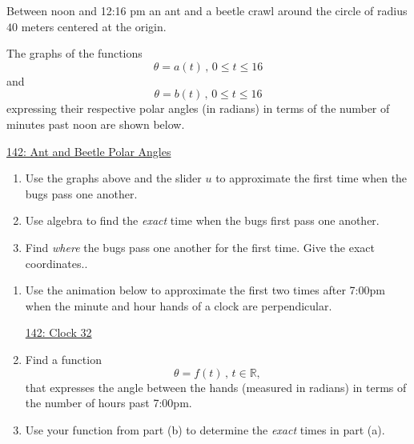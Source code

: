 \documentclass{ximera}
\begin{document}
\begin{question}  \label{Q9dfdfhhhfe94tf4}

Between noon and 12:16 pm an ant and a beetle crawl around the circle of radius $40$ meters centered at the origin.  

The graphs of the functions
\[
  \theta = a(t) \, , \, 0\leq t \leq 16
\]
and
\[
   \theta = b(t) \, , \, 0\leq t \leq 16
\]
expressing their respective polar angles (in radians) in terms of the number of minutes past noon are shown below.

\begin{onlineOnly}
    \begin{center}
\end{center}
\end{onlineOnly}

\href{https://www.desmos.com/calculator/dilqmqqrt4}{142: Ant and Beetle Polar Angles}


\begin{enumerate}

\item Use the graphs above and the slider $u$ to approximate the first time when the bugs pass one another. 

\item Use algebra to find the \emph{exact} time when the bugs first pass one another.

\item Find \emph{where} the bugs pass one another for the first time. Give the exact coordinates..

\end{enumerate}

\end{question}


\begin{question} \label{Qdgbhyy7777}
\begin{enumerate} 
\item Use the animation below to approximate the first two times after 7:00pm when the minute and hour hands of a clock are perpendicular.

\begin{onlineOnly}
    \begin{center}
\end{center}
\end{onlineOnly}

\href{https://www.desmos.com/calculator/rdqfuflcmq}{142: Clock 32}


\item Find a function 
\[
  \theta = f(t) \, , \, t\in \mathbb{R} ,
\]
that expresses the angle between the hands (measured in radians) in terms of the number of hours past 7:00pm.

\item Use your function from part (b) to determine the \emph{exact} times in part (a).
\end{enumerate}

\end{question}
\end{document}
